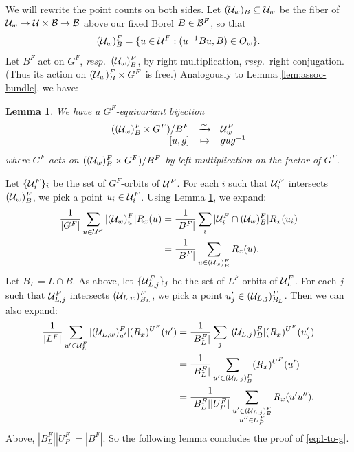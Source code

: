 \documentclass[a4paper,10pt,leqno]{amsart}
\theoremstyle{plain}
\theoremstyle{plain}
\theoremstyle{plain}
\newtheorem{lem}[thm]{Lemma}
\theoremstyle{definition}
\theoremstyle{remark}
\begin{document}
We will rewrite the point counts on both sides.
Let $(\cal{U}_w)_B \subseteq \cal{U}_w$ be the fiber of $\cal{U}_w \to \cal{U} \times \cal{B} \to \cal{B}$ above our fixed Borel $B \in \cal{B}^F$, so that
\begin{align}
(\cal{U}_w)_B^F = \{u \in \cal{U}^F : (u^{-1}Bu, B) \in O_w\}.
\end{align}
Let $B^F$ act on $G^F$, \emph{resp.}\ $(\cal{U}_w)_B^F$, by right multiplication, \emph{resp.}\ right conjugation.
(Thus its action on $(\cal{U}_w)_B^F \times G^F$ is free.)
Analogously to Lemma \ref{lem:assoc-bundle}, we have:

\begin{lem}\label{lem:bruhat}
We have a $G^F$-equivariant bijection
\begin{align}
\begin{array}{rcl}
((\cal{U}_w)_B^F \times G^F)/B^F 
	&\xrightarrow{\sim} 
	&\cal{U}_w^F\\
{[u, g]}
	&\mapsto 
	&gug^{-1}
\end{array}
\end{align}
where $G^F$ acts on $((\cal{U}_w)_B^F \times G^F)/B^F$ by left multiplication on the factor of $G^F$.
\end{lem}

Let $\{\cal{U}_i^F\}_i$ be the set of $G^F$-orbits of $\cal{U}^F$.
For each $i$ such that $\cal{U}_i^F$ intersects $(\cal{U}_w)_B^F$, we pick a point $u_i \in \cal{U}_i^F$.
Using Lemma \ref{lem:bruhat}, we expand:
\begin{align}\begin{split}
\frac{1}{|G^F|}
\sum_{u \in \cal{U}^F} 
	|(\cal{U}_w)_u^F| R_x(u)
&=	\frac{1}{|B^F|}
\sum_i
|\cal{U}_i^F \cap (\cal{U}_w)_B^F| R_x(u_i)\\
&=	\frac{1}{|B^F|}
\sum_{u \in (\cal{U}_w)_B^F}
R_x(u).
\end{split}\end{align}
Let $B_L = L \cap B$.
As above, let $\{\cal{U}_{L, j}^F\}_j$ be the set of $L^F$-orbits of $\cal{U}_L^F$.
For each $j$ such that $\cal{U}_{L, j}^F$ intersects $(\cal{U}_{L, w})_{B_L}^F$, we pick a point $u'_j \in (\cal{U}_{L, j})_{B_L}^F$.
Then we can also expand:
\begin{align}\begin{split}
\frac{1}{|L^F|}
	\sum_{u' \in \cal{U}_L^F}
	|(\cal{U}_{L, w})_{u'}^F|
	(R_x)^{U^F}(u')
&=	\frac{1}{|B_L^F|}
	\sum_j
	|(\cal{U}_{L, j})_B^F|
	(R_x)^{U^F}(u'_j)
	\\
&=	\frac{1}{|B_L^F|}
	\sum_{u' \in (\cal{U}_{L, j})_B^F}
	(R_x)^{U^F}(u')\\
&=	\frac{1}{|B_L^F||U_P^F|}
	\sum_{\substack{u' \in (\cal{U}_{L, j})_B^F \\ u'' \in U_P^F}}
	R_x(u'u'').
\end{split}\end{align}
Above, $|B_L^F||U_P^F| = |B^F|$.
So the following lemma concludes the proof of \eqref{eq:l-to-g}.
\end{document}
